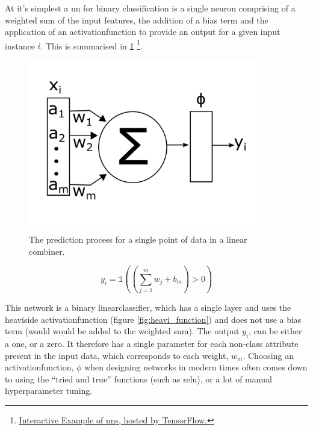 At it's simplest a \gls{nn} for binary classification is a single \gls{neuron} comprising of a weighted sum of the input features, the addition of a bias term and the application of an \gls{activationfunction} to provide an output for a given input \gls{instance} $i$. This is summarised in \ref{fig:nn_simple} \footnote{\href{https://playground.tensorflow.org/}{Interactive Example of \gls{nn}s, hosted by TensorFlow.}}.  

\begin{figure}
    \centering
    \includegraphics[width=100mm]{figs/nn_simple.png}
    \caption{The prediction process for a single point of data in a linear combiner.}
    \label{fig:nn_simple}
\end{figure}

\begin{equation}
    y_i = \mathds{1} ((\sum_{j = 1}^m w_j + b_m) > 0)
    \label{eq:nn_simple_pred}
\end{equation}

This network is a binary \gls{linearclassifier}, which has a single \gls{layer} and uses the heaviside \gls{activationfunction} (figure \ref{fig:heavi_function}) and does not use a bias term (would would be added to the weighted sum). The output $y_i$, can be either a one, or a zero. It therefore has a single parameter for each non-class attribute present in the input data, which corresponds to each weight, $w_m$. Choosing an \gls{activationfunction}, $\phi$ when designing networks in modern times often comes down to using the \enquote{tried and true} functions (such as \gls{relu}), or a lot of manual \gls{hyperparameter} tuning.

